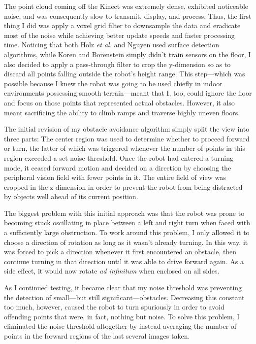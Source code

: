 \documentclass[12pt]{report}
\begin{document}
The point cloud coming off the Kinect was extremely dense, exhibited noticeable noise, and was consequently slow to transmit, display, and process.  Thus, the first thing I did was apply a voxel grid filter to downsample the data and eradicate most of the noise while achieving better update speeds and faster processing time.  Noticing that both Holz \textit{et al.} and Nguyen used surface detection algorithms, while Koren and Borenstein simply didn't train sensors on the floor, I also decided to apply a pass-through filter to crop the y-dimension so as to discard all points falling outside the robot's height range.  This step---which was possible because I knew the robot was going to be used chiefly in indoor environments possessing smooth terrain---meant that I, too, could ignore the floor and focus on those points that represented actual obstacles.  However, it also meant sacrificing the ability to climb ramps and traverse highly uneven floors.

The initial revision of my obstacle avoidance algorithm simply split the view into three parts:  The center region was used to determine whether to proceed forward or turn, the latter of which was triggered whenever the number of points in this region exceeded a set noise threshold.  Once the robot had entered a turning mode, it ceased forward motion and decided on a direction by choosing the peripheral vision field with fewer points in it.  The entire field of view was cropped in the z-dimension in order to prevent the robot from being distracted by objects well ahead of its current position.

The biggest problem with this initial approach was that the robot was prone to becoming stuck oscillating in place between a left and right turn when faced with a sufficiently large obstruction.  To work around this problem, I only allowed it to choose a direction of rotation as long as it wasn't already turning.  In this way, it was forced to pick a direction whenever it first encountered an obstacle, then continue turning in that direction until it was able to drive forward again.  As a side effect, it would now rotate \textit{ad infinitum} when enclosed on all sides.

As I continued testing, it became clear that my noise threshold was preventing the detection of small---but still significant---obstacles.  Decreasing this constant too much, however, caused the robot to turn spuriously in order to avoid offending points that were, in fact, nothing but noise.  To solve this problem, I eliminated the noise threshold altogether by instead averaging the number of points in the forward regions of the last several images taken.
\end{document}
